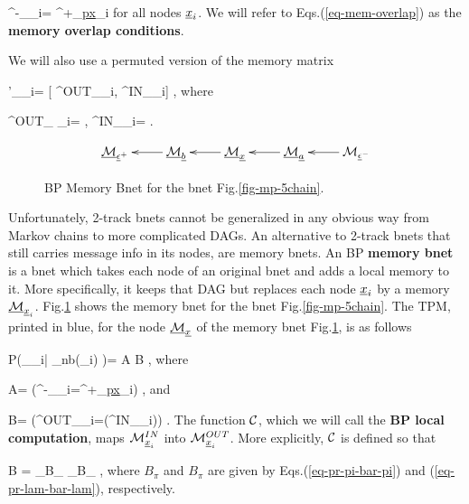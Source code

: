 \beq
\calm^-_{\rvx_i}=
\calm^+_{\ul{px}_i}
\label{eq-mem-overlap}
\eeq
for all nodes ${\underline{x}}_i$.
We will refer to
Eqs.(\ref{eq-mem-overlap}) as
the {\bf memory overlap
conditions}.

We will also use a permuted version of the
memory matrix

\beq
\calm'_{\rvx_i}=
[
\calm^{OUT}_{\rvx_i},
\calm^{IN}_{\rvx_i}]
\;,
\eeq
where

\beq
\calm^{OUT}_{ \rvx_i}=
\;,
\;\;\;
\calm^{IN}_{\rvx_i}=
\;.
\eeq

\begin{figure}[h!]
$$\xymatrix{
\ucalm_{\rveps^+}
&
\ucalm_\rvb\ar[l]
&
\ucalm_\rvx\ar[l]
&
\ucalm_\rva\ar[l]
&
\calm_{\rveps^-}\ar[l]
}$$
\caption{BP Memory Bnet for the bnet
Fig.\ref{fig-mp-5chain}. }
\label{fig-mem-5chain}
\end{figure}

Unfortunately,
2-track bnets cannot be
 generalized in any
obvious way  from
Markov chains to more
complicated DAGs.
An alternative to 2-track bnets
that still
carries message
info in its nodes,
are memory bnets. An BP
{\bf memory bnet}
is a bnet
which takes each node
of an original
bnet and
adds a local memory to it.
More specifically,
it keeps that DAG
but replaces each node
${\underline{x}}_i$
by a memory $\underline{{\cal M}}_{{\underline{x}}_i}$.
Fig.\ref{fig-mem-5chain} shows
the memory bnet for
the bnet Fig.\ref{fig-mp-5chain}.
The TPM, printed in blue,
for the  node $\underline{{\cal M}}_{\underline{x}}$
of the memory bnet
Fig.\ref{fig-mem-5chain}, is as follows

\beq\color{blue}
P(\calm_{\rvx_i}|
\calm_{\rvn\in nb(\rvx_i)}
)= A B
\;,
\eeq
where

\beq
A=
\indi(\calm^{-}_{\rvx_i}=\calm^{+}_{\ul{px}_i})
\;,
\eeq
and

\beq
B=
\indi(\calm^{OUT}_{\rvx_i}=\calc(\calm^{IN}_{\rvx_i}))
\label{eq-mp-update-static}
\;.
\eeq
The function ${\cal C}$,
which
we will call the {\bf BP local computation},
maps ${\cal M}^{IN}_{{\underline{x}}_i}$
into ${\cal M}^{OUT}_{{\underline{x}}_i}$. More explicitly,
${\cal C}$ is defined so that

\beq
B
=
_{B_\pi}
_{B_\pi}
\;,
\eeq
where
$B_\pi$ and $B_\pi$
are given by Eqs.(\ref{eq-pr-pi-bar-pi})
and (\ref{eq-pr-lam-bar-lam}),
respectively.



